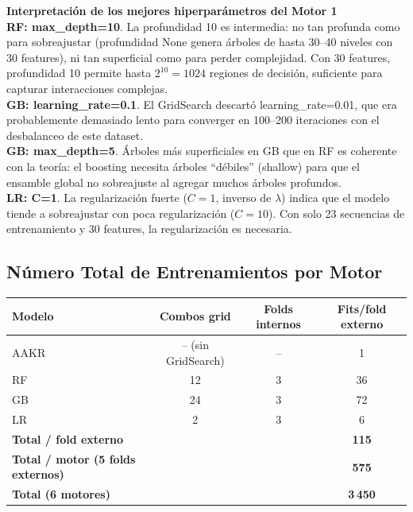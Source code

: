 \documentclass[12pt,a4paper]{article}
\begin{document}
\begin{porquebox}
\textbf{Interpretaci\'{o}n de los mejores hiperpar\'{a}metros del Motor 1}\\[4pt]
\textbf{RF: max\_depth=10}. La profundidad 10 es intermedia: no tan profunda como para
sobreajustar (profundidad None genera \'{a}rboles de hasta 30--40 niveles con 30 features),
ni tan superficial como para perder complejidad. Con 30 features, profundidad 10
permite hasta $2^{10} = 1024$ regiones de decisi\'{o}n, suficiente para capturar
interacciones complejas.\\[4pt]
\textbf{GB: learning\_rate=0.1}. El GridSearch descart\'{o} learning\_rate=0.01, que era
probablemente demasiado lento para converger en 100--200 iteraciones con el desbalanceo
de este dataset.\\[4pt]
\textbf{GB: max\_depth=5}. \'{A}rboles m\'{a}s superficiales en GB que en RF es coherente
con la teor\'{i}a: el boosting necesita \'{a}rboles ``d\'{e}biles'' (shallow) para que el
ensamble global no sobreajuste al agregar muchos \'{a}rboles profundos.\\[4pt]
\textbf{LR: C=1}. La regularizaci\'{o}n fuerte ($C=1$, inverso de $\lambda$) indica que
el modelo tiende a sobreajustar con poca regularizaci\'{o}n ($C=10$). Con solo 23
secuencias de entrenamiento y 30 features, la regularizaci\'{o}n es necesaria.
\end{porquebox}

\subsection{N\'{u}mero Total de Entrenamientos por Motor}

\begin{center}
\begin{tabular}{lccc}
\toprule
\textbf{Modelo} & \textbf{Combos grid} & \textbf{Folds internos} & \textbf{Fits/fold externo} \\
\midrule
AAKR & -- (sin GridSearch) & -- & 1 \\
RF   & 12 & 3 & 36 \\
GB   & 24 & 3 & 72 \\
LR   & 2  & 3 & 6  \\
\midrule
\textbf{Total / fold externo} & & & \textbf{115} \\
\textbf{Total / motor (5 folds externos)} & & & \textbf{575} \\
\textbf{Total (6 motores)} & & & \textbf{3\,450} \\
\bottomrule
\end{tabular}
\end{center}
\end{document}
